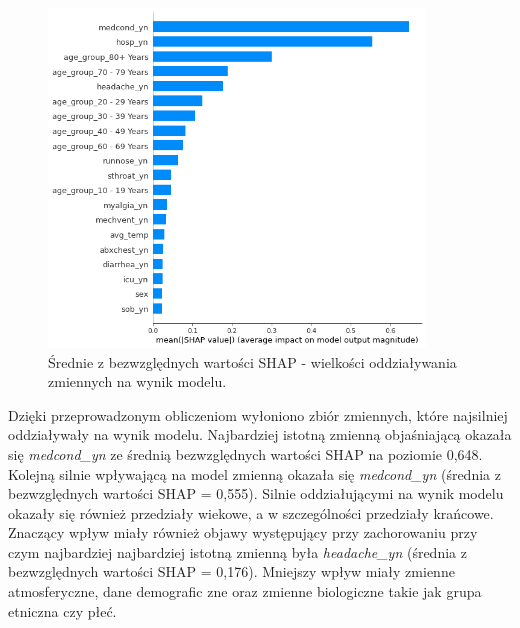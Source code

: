 \documentclass[polish, twoside, 12pt, a4paper]{article}
\theoremstyle{definition}
\theoremstyle{plain}
\theoremstyle{remark}
\begin{document}
\begin{figure}[H]
\centering
\includegraphics[width=10cm]{shap_abs.png}
\caption{Średnie z bezwzględnych wartości SHAP  - wielkości oddziaływania zmiennych na wynik modelu.}
\end{figure}

Dzięki przeprowadzonym obliczeniom wyłoniono zbiór zmiennych, które najsilniej oddziaływały na wynik modelu. Najbardziej istotną zmienną objaśniającą okazała się \emph{medcond\_yn} ze średnią bezwzględnych wartości SHAP na poziomie 0,648. Kolejną silnie wpływającą na model zmienną okazała się \emph{medcond\_yn} (średnia z bezwzględnych wartości SHAP = 0,555). Silnie oddziałującymi na wynik modelu okazały się również przedziały wiekowe, a w szczególności przedziały krańcowe. Znaczący wpływ miały również objawy występujący przy zachorowaniu przy czym najbardziej najbardziej istotną zmienną była \emph{headache\_yn} (średnia z bezwzględnych wartości SHAP = 0,176). Mniejszy wpływ miały zmienne atmosferyczne, dane demografic
zne oraz zmienne biologiczne takie jak grupa etniczna czy płeć.
\end{document}
